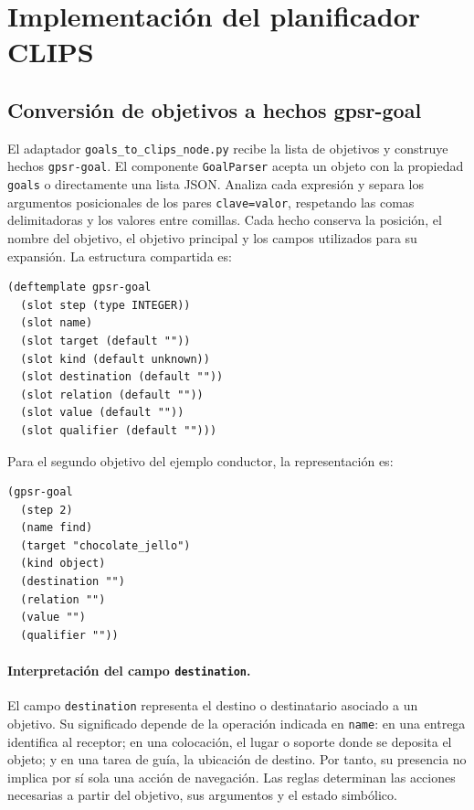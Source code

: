 \section{Implementación del planificador CLIPS}
\label{sec:implementacion_clips}

\subsection{Conversión de objetivos a hechos gpsr-goal}
\label{subsec:adaptador_objetivos_impl}

El adaptador \texttt{goals\_\allowbreak to\_\allowbreak clips\_\allowbreak node.\allowbreak py} recibe la lista de
objetivos y construye hechos \texttt{gpsr-goal}. El componente
\texttt{GoalParser} acepta un objeto con la propiedad \texttt{goals}
o directamente una lista JSON. Analiza cada expresión y separa los
argumentos posicionales de los pares \texttt{clave=valor}, respetando
las comas delimitadoras y los valores entre comillas. Cada hecho conserva
la posición, el nombre del objetivo, el objetivo principal y los
campos utilizados para su expansión. La estructura compartida es:

\begin{verbatim}
(deftemplate gpsr-goal
  (slot step (type INTEGER))
  (slot name)
  (slot target (default ""))
  (slot kind (default unknown))
  (slot destination (default ""))
  (slot relation (default ""))
  (slot value (default ""))
  (slot qualifier (default "")))
\end{verbatim}

Para el segundo objetivo del ejemplo conductor, la representación es:

\begin{verbatim}
(gpsr-goal
  (step 2)
  (name find)
  (target "chocolate_jello")
  (kind object)
  (destination "")
  (relation "")
  (value "")
  (qualifier ""))
\end{verbatim}

\paragraph{Interpretación del campo \texttt{destination}.}

El campo \texttt{destination} representa el destino o destinatario
asociado a un objetivo. Su significado depende de la operación
indicada en \texttt{name}: en una entrega identifica al receptor;
en una colocación, el lugar o soporte donde se deposita el objeto;
y en una tarea de guía, la ubicación de destino. Por tanto, su
presencia no implica por sí sola una acción de navegación. Las
reglas determinan las acciones necesarias a partir del objetivo,
sus argumentos y el estado simbólico.

